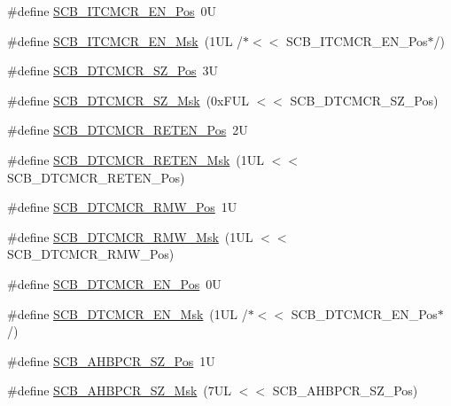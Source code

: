 \begin{DoxyCompactItemize}
\item 
\#define \hyperlink{group___c_m_s_i_s___s_c_b_ga5d2fc7c04a8aaedff19bd4ff6de187eb}{S\+C\+B\+\_\+\+I\+T\+C\+M\+C\+R\+\_\+\+E\+N\+\_\+\+Pos}~0U
\item 
\#define \hyperlink{group___c_m_s_i_s___s_c_b_ga4d1c57f26a03910ab0549efecd2a602c}{S\+C\+B\+\_\+\+I\+T\+C\+M\+C\+R\+\_\+\+E\+N\+\_\+\+Msk}~(1\+U\+L /$\ast$$<$$<$ S\+C\+B\+\_\+\+I\+T\+C\+M\+C\+R\+\_\+\+E\+N\+\_\+\+Pos$\ast$/)
\item 
\#define \hyperlink{group___c_m_s_i_s___s_c_b_ga3cacd7498eb3c022ecc7e21a3dfc3c13}{S\+C\+B\+\_\+\+D\+T\+C\+M\+C\+R\+\_\+\+S\+Z\+\_\+\+Pos}~3U
\item 
\#define \hyperlink{group___c_m_s_i_s___s_c_b_ga35b381dd367cd1533f5c2b2c88720b72}{S\+C\+B\+\_\+\+D\+T\+C\+M\+C\+R\+\_\+\+S\+Z\+\_\+\+Msk}~(0x\+F\+U\+L $<$$<$ S\+C\+B\+\_\+\+D\+T\+C\+M\+C\+R\+\_\+\+S\+Z\+\_\+\+Pos)
\item 
\#define \hyperlink{group___c_m_s_i_s___s_c_b_ga8b72fb208ee772734e580911a8e522ce}{S\+C\+B\+\_\+\+D\+T\+C\+M\+C\+R\+\_\+\+R\+E\+T\+E\+N\+\_\+\+Pos}~2U
\item 
\#define \hyperlink{group___c_m_s_i_s___s_c_b_gaa69bbf5b17808383d88f23a424c1b62e}{S\+C\+B\+\_\+\+D\+T\+C\+M\+C\+R\+\_\+\+R\+E\+T\+E\+N\+\_\+\+Msk}~(1\+U\+L $<$$<$ S\+C\+B\+\_\+\+D\+T\+C\+M\+C\+R\+\_\+\+R\+E\+T\+E\+N\+\_\+\+Pos)
\item 
\#define \hyperlink{group___c_m_s_i_s___s_c_b_ga11c115ca21511be7e56e997a8bde567a}{S\+C\+B\+\_\+\+D\+T\+C\+M\+C\+R\+\_\+\+R\+M\+W\+\_\+\+Pos}~1U
\item 
\#define \hyperlink{group___c_m_s_i_s___s_c_b_ga79b099c3a4365b434aaf55ebbd534420}{S\+C\+B\+\_\+\+D\+T\+C\+M\+C\+R\+\_\+\+R\+M\+W\+\_\+\+Msk}~(1\+U\+L $<$$<$ S\+C\+B\+\_\+\+D\+T\+C\+M\+C\+R\+\_\+\+R\+M\+W\+\_\+\+Pos)
\item 
\#define \hyperlink{group___c_m_s_i_s___s_c_b_gaf3ba6873b9288121146a6432db53540f}{S\+C\+B\+\_\+\+D\+T\+C\+M\+C\+R\+\_\+\+E\+N\+\_\+\+Pos}~0U
\item 
\#define \hyperlink{group___c_m_s_i_s___s_c_b_gafd9689d338f30fa434c7629083f29608}{S\+C\+B\+\_\+\+D\+T\+C\+M\+C\+R\+\_\+\+E\+N\+\_\+\+Msk}~(1\+U\+L /$\ast$$<$$<$ S\+C\+B\+\_\+\+D\+T\+C\+M\+C\+R\+\_\+\+E\+N\+\_\+\+Pos$\ast$/)
\item 
\#define \hyperlink{group___c_m_s_i_s___s_c_b_ga0f5d024d0d233713c33c5ba1a936d8d2}{S\+C\+B\+\_\+\+A\+H\+B\+P\+C\+R\+\_\+\+S\+Z\+\_\+\+Pos}~1U
\item 
\#define \hyperlink{group___c_m_s_i_s___s_c_b_ga9a22251ee32265508a9aa7bcff3e317a}{S\+C\+B\+\_\+\+A\+H\+B\+P\+C\+R\+\_\+\+S\+Z\+\_\+\+Msk}~(7\+U\+L $<$$<$ S\+C\+B\+\_\+\+A\+H\+B\+P\+C\+R\+\_\+\+S\+Z\+\_\+\+Pos)

\end{DoxyCompactItemize}
